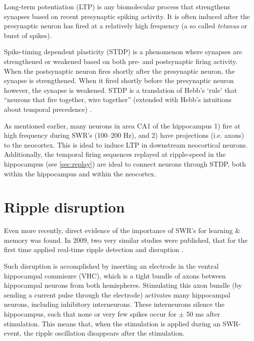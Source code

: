 Long-term potentiation (LTP) is any biomolecular process that strengthens  synapses based on recent presynaptic spiking activity. It is often induced after the presynaptic neuron has fired at a relatively high frequency (a so called \emph{tetanus} or burst of spikes).

Spike-timing dependent plasticity (STDP) is a phenomenon where synapses are strengthened or weakened based on both pre- and postsynaptic firing activity. When the postsynaptic neuron fires shortly after the presynaptic neuron, the synapse is strengthened. When it fired shortly before the presynaptic neuron however, the synapse is weakened. STDP is a translation of Hebb's `rule' that ``neurons that fire together, wire together'' (extended with Hebb's intuitions about temporal precedence) \cite{Caporale2008}.

As mentioned earlier, many neurons in area CA1 of the hippocampus 1) fire at high frequency during SWR's (100--200 Hz), and 2) have projections (i.e. axons) to the neocortex. This is ideal to induce LTP in downstream neocortical neurons. Additionally, the temporal firing sequences replayed at ripple-speed in the hippocampus (see \cref{sec:replay}) are ideal to connect neurons through STDP, both within the hippocampus and within the neocortex.





\section{Ripple disruption}
\label{sec:disruption}

Even more recently, direct evidence of the importance of SWR's for learning \& memory was found. In 2009, two very similar studies were published, that for the first time applied real-time ripple detection and disruption \cite{Ego-Stengel2009,Girardeau2009}.

Such disruption is accomplished by inserting an electrode in the ventral hippocampal commisure (VHC), which is a tight bundle of axons between hippocampal neurons from both hemispheres. Stimulating this axon bundle (by sending a current pulse through the electrode) activates many hippocampal neurons, including inhibitory interneurons. These interneurons silence the hippocampus, such that none or very few spikes occur for $\pm$ 50 ms after stimulation. This means that, when the stimulation is applied during an SWR-event, the ripple oscillation disappears after the stimulation.

